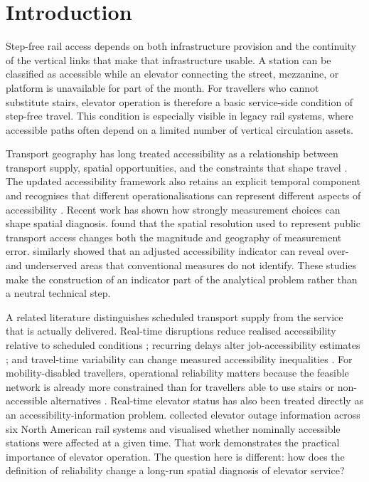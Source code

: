 \section{Introduction}

Step-free rail access depends on both infrastructure provision and the continuity of the vertical links that make that infrastructure usable. A station can be classified as accessible while an elevator connecting the street, mezzanine, or platform is unavailable for part of the month. For travellers who cannot substitute stairs, elevator operation is therefore a basic service-side condition of step-free travel. This condition is especially visible in legacy rail systems, where accessible paths often depend on a limited number of vertical circulation assets.

Transport geography has long treated accessibility as a relationship between transport supply, spatial opportunities, and the constraints that shape travel \citep{geurs2004}. The updated accessibility framework also retains an explicit temporal component and recognises that different operationalisations can represent different aspects of accessibility \citep{geurs2026}. Recent work has shown how strongly measurement choices can shape spatial diagnosis. \citet{qu2025} found that the spatial resolution used to represent public transport access changes both the magnitude and geography of measurement error. \citet{schroth2026} similarly showed that an adjusted accessibility indicator can reveal over- and underserved areas that conventional measures do not identify. These studies make the construction of an indicator part of the analytical problem rather than a neutral technical step.

A related literature distinguishes scheduled transport supply from the service that is actually delivered. Real-time disruptions reduce realised accessibility relative to scheduled conditions \citep{liu2024}; recurring delays alter job-accessibility estimates \citep{nichols2024}; and travel-time variability can change measured accessibility inequalities \citep{braga2026}. For mobility-disabled travellers, operational reliability matters because the feasible network is already more constrained than for travellers able to use stairs or non-accessible alternatives \citep{liu2023}. Real-time elevator status has also been treated directly as an accessibility-information problem. \citet{sharif2022} collected elevator outage information across six North American rail systems and visualised whether nominally accessible stations were affected at a given time. That work demonstrates the practical importance of elevator operation. The question here is different: how does the definition of reliability change a long-run spatial diagnosis of elevator service?

